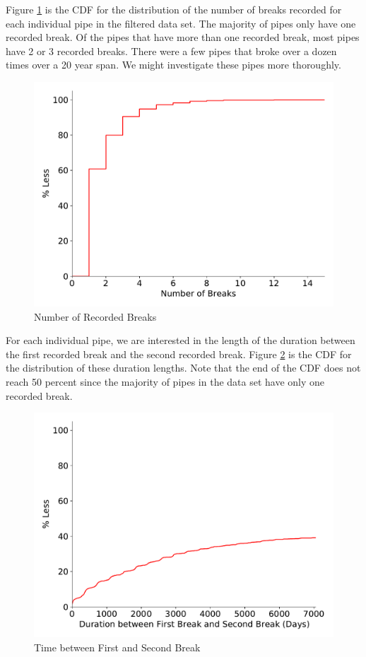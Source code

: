 \documentclass[twocolumn]{article}
\begin{document}
Figure \ref{fig:num breaks} is the CDF for the distribution of the number of breaks recorded for each individual pipe in the filtered data set. The majority of pipes only have one recorded break. Of the pipes that have more than one recorded break, most pipes have 2 or 3 recorded breaks. There were a few pipes that broke over a dozen times over a 20 year span. We might investigate these pipes more thoroughly.

\begin{figure}[H]
    \includegraphics[width = \columnwidth]{Bryan/num_breaks.pdf}
    \caption{Number of Recorded Breaks}
    \label{fig:num breaks}
\end{figure}

For each individual pipe, we are interested in the length of the duration between the first recorded break and the second recorded break. Figure \ref{fig:first second break} is the CDF for the distribution of these duration lengths. Note that the end of the CDF does not reach 50 percent since the majority of pipes in the data set have only one recorded break. 

\begin{figure}[H]
    \includegraphics[width = \columnwidth]{Bryan/first_second_break.pdf}
    \caption{Time between First and Second Break}
    \label{fig:first second break}
\end{figure}
\end{document}
